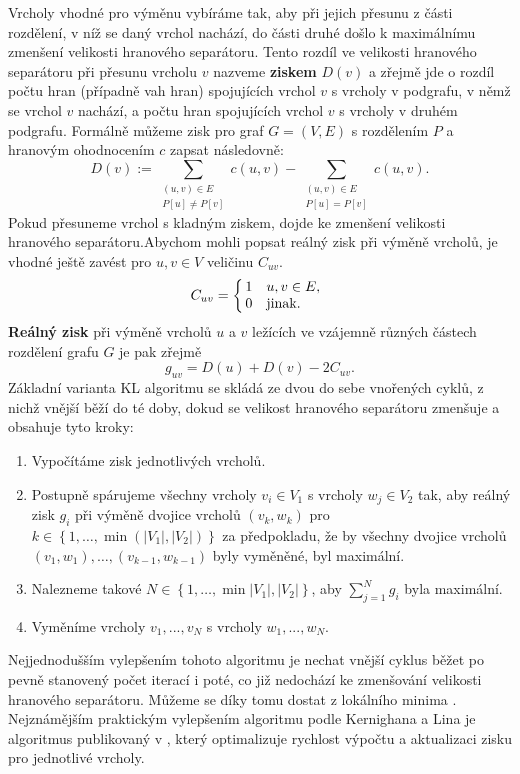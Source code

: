 \documentclass{ctuthesis}
\theoremstyle{plain}
\theoremstyle{definition}
\begin{document}
Vrcholy vhodné pro výměnu vybíráme tak, aby při jejich přesunu z části rozdělení, v níž se daný vrchol nachází, do části druhé došlo k maximálnímu zmenšení velikosti hranového separátoru. Tento rozdíl ve velikosti hranového separátoru při přesunu vrcholu $v$ nazveme \textbf{ziskem} $D(v)$ a zřejmě jde o rozdíl počtu hran (případně vah hran) spojujících vrchol $v$ s vrcholy v podgrafu, v němž se vrchol $v$ nachází, a počtu hran spojujících vrchol $v$ s vrcholy v druhém podgrafu. Formálně můžeme zisk pro graf $G=(V,E)$ s rozdělením $P$ a hranovým ohodnocením $c$ zapsat následovně:
\[
D(v) := \sum\limits_{\substack{(u,v) \in E \\ P[u] \neq P[v]}}c(u,v) - \sum\limits_{\substack{(u,v) \in E \\ P[u] = P[v]}}c(u,v).
\]
Pokud přesuneme vrchol s kladným ziskem, dojde ke zmenšení velikosti hranového separátoru.Abychom mohli popsat reálný zisk při výměně vrcholů, je vhodné ještě zavést pro $u,v \in V$ veličinu $C_{uv}$.
\[
C_{uv}=
    \left\{
    \begin{array}{@{\,}ll}
		1  & \mbox{} {u,v} \in E,\\
		0 & \mbox{jinak.}
	\end{array}
\right.
\]
\textbf{Reálný zisk} při výměně vrcholů $u$ a $v$ ležících ve vzájemně různých částech rozdělení grafu $G$ je pak zřejmě
\[
g_{uv}=D(u)+D(v)-2C_{uv}.
\]
Základní varianta KL algoritmu se skládá ze dvou do sebe vnořených cyklů, z nichž vnější běží do té doby, dokud se velikost hranového separátoru zmenšuje a obsahuje tyto kroky:
\begin{enumerate}
  \item Vypočítáme zisk jednotlivých vrcholů.
  \item Postupně spárujeme všechny vrcholy $v_i \in V_1$ s vrcholy $w_j \in V_2$ tak, aby reálný zisk $g_i$ při výměně dvojice vrcholů $(v_k,w_k)$ pro $k \in \left\{1,\ldots,\min(|V_1|,|V_2|)\right\}$ za předpokladu, že by všechny dvojice vrcholů $(v_1,w_1),\ldots,(v_{k-1},w_{k-1})$ byly vyměněné, byl maximální.
  \item Nalezneme takové $N \in \left\{1,\ldots,\min{|V_1|,|V_2|}\right\}$, aby $\sum_{j=1}^{N}g_i$ byla maximální.
  \item Vyměníme vrcholy $v_1,...,v_N$ s vrcholy $w_1,...,w_N$.
\end{enumerate}

Nejjednodušším vylepšením tohoto algoritmu je nechat vnější cyklus běžet po pevně stanovený počet iterací i poté, co již nedochází ke zmenšování velikosti hranového separátoru. Můžeme se díky tomu dostat z lokálního minima \cite{keli:70}. Nejznámějším praktickým vylepšením algoritmu podle Kernighana a Lina je algoritmus publikovaný v \cite{fima:89}, který optimalizuje rychlost výpočtu a aktualizaci zisku pro jednotlivé vrcholy.
\end{document}
